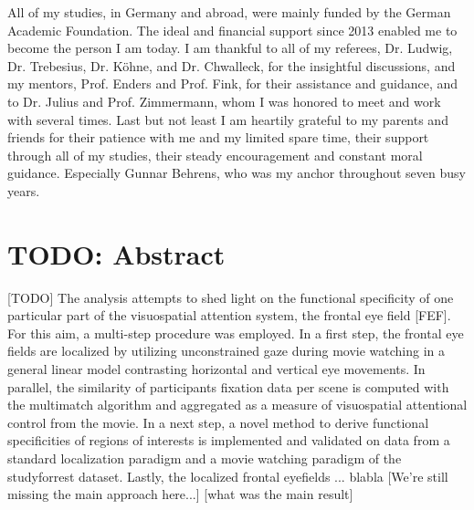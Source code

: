 \documentclass[a4paper, 12pt]{scrreprt}
\begin{document}
{All of my studies, in Germany and abroad, were mainly funded by the German Academic Foundation. The ideal and financial support since 2013 enabled me to become the person I am today. I am thankful to all of my referees, Dr. Ludwig, Dr. Trebesius, Dr. Köhne, and Dr. Chwalleck, for the insightful discussions, and my mentors, Prof. Enders and Prof. Fink, for their assistance and guidance, and to Dr. Julius and Prof. Zimmermann, whom I was honored to meet and work with several times. \newline
Last but not least I am heartily grateful to my parents and friends for their patience with me and my limited spare time, their support through all of my studies, their steady encouragement and constant moral guidance. Especially Gunnar Behrens, who was my anchor throughout seven busy years.}


\clearpage

\setcounter{page}{1}	%


\chapter*{TODO: Abstract}

[TODO]     \newline
The analysis attempts to shed light on the functional specificity of one particular part of the visuospatial attention system, the frontal eye field [FEF]. For this aim, a multi-step procedure was employed. In a first step, the frontal eye fields are localized by utilizing unconstrained gaze during movie watching in a general linear model contrasting horizontal and vertical eye movements. In parallel, the similarity of participants fixation data per scene is computed with the multimatch algorithm and aggregated as a measure of visuospatial attentional control from the movie. In a next step, a novel method to derive functional specificities of regions of interests is implemented and validated on data from a standard localization paradigm and a movie watching paradigm of the studyforrest dataset. Lastly, the localized frontal eyefields ... blabla
[We're still missing the main approach here...]
[what was the main result] 
\end{document}
